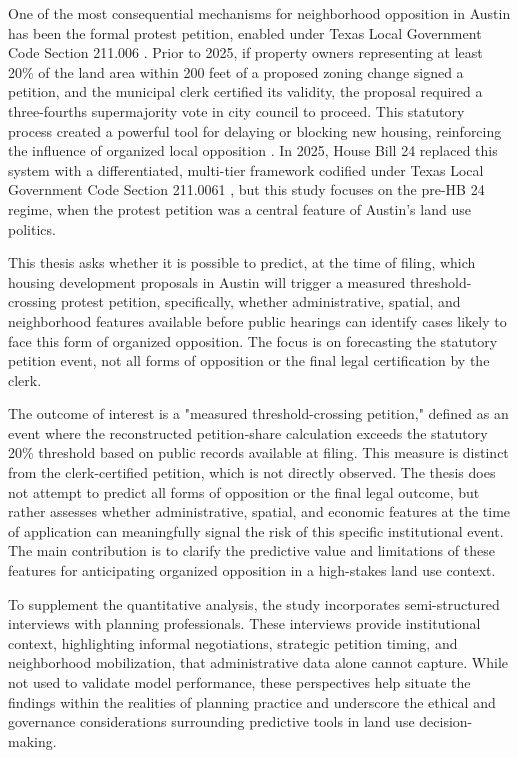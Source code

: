 \documentclass[11pt, letterpaper]{article}
\begin{document}
One of the most consequential mechanisms for neighborhood opposition in Austin has been the formal protest petition, enabled under Texas Local Government Code Section 211.006 \cite{texas211006}. Prior to 2025, if property owners representing at least 20\% of the land area within 200 feet of a proposed zoning change signed a petition, and the municipal clerk certified its validity, the proposal required a three-fourths supermajority vote in city council to proceed. This statutory process created a powerful tool for delaying or blocking new housing, reinforcing the influence of organized local opposition \cite{furth2023invisible}. In 2025, House Bill 24 replaced this system with a differentiated, multi-tier framework codified under Texas Local Government Code Section 211.0061 \cite{texas2110061,hamilton2024texas,hb24_2025}, but this study focuses on the pre-HB 24 regime, when the protest petition was a central feature of Austin's land use politics.

This thesis asks whether it is possible to predict, at the time of filing, which housing development proposals in Austin will trigger a measured threshold-crossing protest petition, specifically, whether administrative, spatial, and neighborhood features available before public hearings can identify cases likely to face this form of organized opposition. The focus is on forecasting the statutory petition event, not all forms of opposition or the final legal certification by the clerk.

The outcome of interest is a "measured threshold-crossing petition," defined as an event where the reconstructed petition-share calculation exceeds the statutory 20\% threshold based on public records available at filing. This measure is distinct from the clerk-certified petition, which is not directly observed. The thesis does not attempt to predict all forms of opposition or the final legal outcome, but rather assesses whether administrative, spatial, and economic features at the time of application can meaningfully signal the risk of this specific institutional event. The main contribution is to clarify the predictive value and limitations of these features for anticipating organized opposition in a high-stakes land use context.

To supplement the quantitative analysis, the study incorporates semi-structured interviews with planning professionals. These interviews provide institutional context, highlighting informal negotiations, strategic petition timing, and neighborhood mobilization, that administrative data alone cannot capture. While not used to validate model performance, these perspectives help situate the findings within the realities of planning practice and underscore the ethical and governance considerations surrounding predictive tools in land use decision-making.
\end{document}
